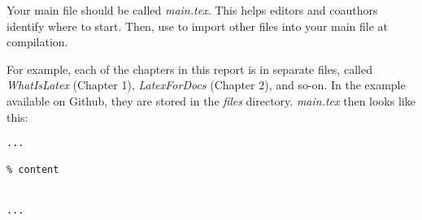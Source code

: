 Your main file should be called \emph{main.tex}. This helps editors and coauthors identify where to start. Then, use \verb++ to import other files into your main file at compilation.

For example, each of the chapters in this report is in separate files, called \emph{WhatIsLatex} (Chapter 1), \emph{LatexForDocs} (Chapter 2), and so-on. In the example available on Github, they are stored in the \emph{files} directory. \emph{main.tex} then looks like this:

\begin{lstlisting}
...

% content


...
\end{lstlisting}
